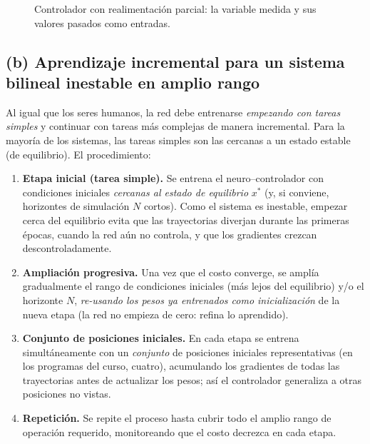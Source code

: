 \documentclass[11pt,a4paper]{article}
\begin{document}
\begin{figure}[h]
\centering
{}
\caption{Controlador con realimentación parcial: la variable medida y sus valores pasados como entradas.}
\end{figure}

\subsection*{(b) Aprendizaje incremental para un sistema bilineal inestable en amplio rango}

Al igual que los seres humanos, la red debe entrenarse \emph{empezando con tareas simples} y continuar con tareas más complejas de manera incremental. Para la mayoría de los sistemas, las tareas simples son las cercanas a un estado estable (de equilibrio). El procedimiento:

\begin{enumerate}[itemsep=2pt]
\item \textbf{Etapa inicial (tarea simple).} Se entrena el neuro--controlador con condiciones iniciales \emph{cercanas al estado de equilibrio} $x^{*}$ (y, si conviene, horizontes de simulación $N$ cortos). Como el sistema es inestable, empezar cerca del equilibrio evita que las trayectorias diverjan durante las primeras épocas, cuando la red aún no controla, y que los gradientes crezcan descontroladamente.
\item \textbf{Ampliación progresiva.} Una vez que el costo converge, se amplía gradualmente el rango de condiciones iniciales (más lejos del equilibrio) y/o el horizonte $N$, \emph{re-usando los pesos ya entrenados como inicialización} de la nueva etapa (la red no empieza de cero: refina lo aprendido).
\item \textbf{Conjunto de posiciones iniciales.} En cada etapa se entrena simultáneamente con un \emph{conjunto} de posiciones iniciales representativas (en los programas del curso, cuatro), acumulando los gradientes de todas las trayectorias antes de actualizar los pesos; así el controlador generaliza a otras posiciones no vistas.
\item \textbf{Repetición.} Se repite el proceso hasta cubrir todo el amplio rango de operación requerido, monitoreando que el costo decrezca en cada etapa.
\end{enumerate}
\end{document}
